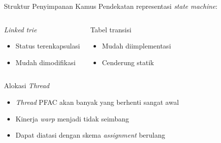 \documentclass[10pt,xcolor=table]{beamer}
\begin{document}
\begin{frame}{Struktur Penyimpanan Kamus}
    Pendekatan representasi \emph{state machine}:
    \begin{columns}[T,onlytextwidth]

            \begin{block}{\emph{Linked trie}}
            \begin{itemize}
                \item Status terenkapsulasi
                \item Mudah dimodifikasi
            \end{itemize}
            \end{block}
    
    
            \begin{block}{Tabel transisi}
            \begin{itemize}
                \item Mudah diimplementasi
                \item Cenderung statik
            \end{itemize}
            \end{block}
    
    \end{columns}
\end{frame}

\begin{frame}{Alokasi \emph{Thread}}
    \begin{itemize}

        \item \emph{Thread} PFAC akan banyak yang berhenti sangat awal

        \item Kinerja \emph{warp} menjadi tidak seimbang

        \item Dapat diatasi dengan skema \emph{assignment} berulang

    \end{itemize}
\end{frame}
\end{document}
